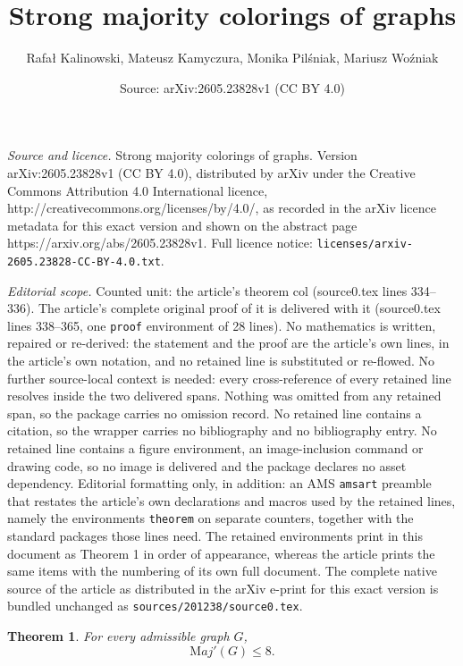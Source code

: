 \documentclass[10pt,a4paper]{amsart}
\title{Strong majority colorings of graphs}
\author{Rafa{\l} Kalinowski, Mateusz Kamyczura, Monika Pil\'sniak, Mariusz Wo\'zniak}
\date{Source: arXiv:2605.23828v1 (CC BY 4.0)}
\newtheorem{theorem}{Theorem}
\begin{document}
\maketitle

\noindent\emph{Source and licence.} Strong majority colorings of graphs. Version arXiv:2605.23828v1 (CC BY 4.0), distributed by arXiv under the Creative Commons Attribution 4.0 International licence, http://creativecommons.org/licenses/by/4.0/, as recorded in the arXiv licence metadata for this exact version and shown on the abstract page https://arxiv.org/abs/2605.23828v1. Full licence notice: \texttt{licenses/arxiv-2605.23828-CC-BY-4.0.txt}.\par\smallskip

\noindent\textit{Editorial scope.} Counted unit: the article's theorem col (source0.tex lines 334--336). The article's complete original proof of it is delivered with it (source0.tex lines 338--365, one \texttt{proof} environment of 28 lines). No mathematics is written, repaired or re-derived: the statement and the proof are the article's own lines, in the article's own notation, and no retained line is substituted or re-flowed.  No further source-local context is needed: every cross-reference of every retained line resolves inside the two delivered spans.  Nothing was omitted from any retained span, so the package carries no omission record.  No retained line contains a citation, so the wrapper carries no bibliography and no bibliography entry.  No retained line contains a figure environment, an image-inclusion command or drawing code, so no image is delivered and the package declares no asset dependency.  Editorial formatting only, in addition: an AMS \texttt{amsart} preamble that restates the article's own declarations and macros used by the retained lines, namely the environments \texttt{theorem} on separate counters, together with the standard packages those lines need.  The retained environments print in this document as Theorem 1 in order of appearance, whereas the article prints the same items with the numbering of its own full document.  The complete native source of the article as distributed in the arXiv e-print for this exact version is bundled unchanged as \texttt{sources/201238/source0.tex}.
\begin{theorem}\label{edge col}
For every admissible graph $G$, $${\mathrm Maj'}(G)\le 8.$$    
\end{theorem}
\end{document}
